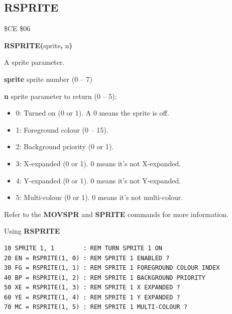 \subsection{RSPRITE}
\begin{description}[leftmargin=2cm,style=nextline]
\item [Token:]    \$CE \$06

\item [Format:]   {\bf RSPRITE(}sprite{\bf,} n{\bf)}

\item [Returns:]  A sprite parameter.

                  {\bf sprite} sprite number (0 -- 7)

                  {\bf n} sprite parameter to return (0 -- 5):

                  \begin{itemize}
                     \item 0: Turned on (0 or 1). A 0 means the sprite is off.
                     \item 1: Foreground colour (0 -- 15).
                     \item 2: Background priority (0 or 1).
                     \item 3: X-expanded (0 or 1). 0 means it's not X-expanded.
                     \item 4: Y-expanded (0 or 1). 0 means it's not Y-expanded.
                     \item 5: Multi-colour (0 or 1). 0 means it's not multi-colour.
                  \end{itemize}

\item [Remarks:]  Refer to the {\bf MOVSPR} and {\bf SPRITE} commands for more information.

\item [Example:]  Using {\bf RSPRITE}

\begin{tcolorbox}[colback=black,coltext=white]
\verbatimfont{\codefont}
\begin{verbatim}
10 SPRITE 1, 1        : REM TURN SPRITE 1 ON
20 EN = RSPRITE(1, 0) : REM SPRITE 1 ENABLED ?
30 FG = RSPRITE(1, 1) : REM SPRITE 1 FOREGROUND COLOUR INDEX
40 BP = RSPRITE(1, 2) : REM SPRITE 1 BACKGROUND PRIORITY
50 XE = RSPRITE(1, 3) : REM SPRITE 1 X EXPANDED ?
60 YE = RSPRITE(1, 4) : REM SPRITE 1 Y EXPANDED ?
70 MC = RSPRITE(1, 5) : REM SPRITE 1 MULTI-COLOUR ?
\end{verbatim}
\end{tcolorbox}
\end{description}

